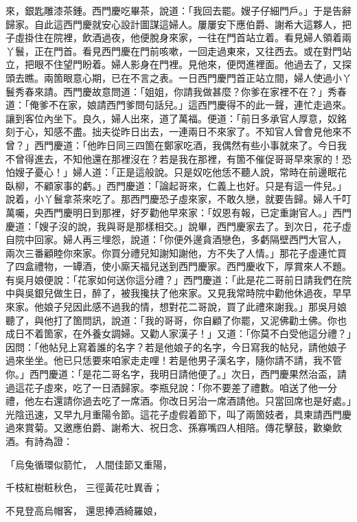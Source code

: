 \begin{showcontents}{}
來，銀匙雕漆茶鍾。西門慶吃畢茶，說道：「我回去罷。嫂子仔細門戶。」于是告辭歸家。自此這西門慶就安心設計圖謀這婦人。屢屢安下應伯爵、謝希大這夥人，把子虛掛住在院裡，飲酒過夜，他便脫身來家，一往在門首站立着。看見婦人領着兩丫鬟，正在門首。看見西門慶在門前咳嗽，一回走過東來，又往西去。或在對門站立，把眼不住望門盼着。婦人影身在門裡。見他來，便閃進裡面。他過去了，又探頭去瞧。兩箇眼意心期，已在不言之表。一日西門慶門首正站立間，婦人使過小丫鬟秀春來請。西門慶故意問道：「姐姐，你請我做甚麼？你爹在家裡不在？」秀春道：「俺爹不在家，娘請西門爹問句話兒。」這西門慶得不的此一聲，連忙走過來。讓到客位內坐下。良久，婦人出來，道了萬福。便道：「前日多承官人厚意，奴銘刻于心，知感不盡。拙夫從昨日出去，一連兩日不來家了。不知官人曾會見他來不曾？」西門慶道：「他昨日同三四箇在鄭家吃酒，我偶然有些小事就來了。今日我不曾得進去，不知他還在那裡沒在？若是我在那裡，有箇不催促哥哥早來家的！恐怕嫂子憂心！」婦人道：「正是這般說。只是奴吃他恁不聽人說，常時在前邊眠花臥柳，不顧家事的虧。」西門慶道：「論起哥來，仁義上也好。只是有這一件兒。」說着，小丫鬟拿茶來吃了。那西門慶恐子虛來家，不敢久戀，就要告歸。婦人千叮萬囑，央西門慶明日到那裡，好歹勸他早來家：「奴恩有報，已定重謝官人。」西門慶道：「嫂子沒的說，我與哥是那樣相交。」說畢，西門慶家去了。到次日，花子虛自院中回家。婦人再三埋怨，說道：「你便外邊貪酒戀色，多虧隔壁西門大官人，兩次三番顧睦你來家。你買分禮兒知謝知謝他，方不失了人情。」那花子虛連忙買了四盒禮物，一罈酒，使小廝天福兒送到西門慶家。西門慶收下，厚賞來人不題。有吳月娘便說：「花家如何送你這分禮？」西門慶道：「此是花二哥前日請我們在院中與吳銀兒做生日，醉了，被我攙扶了他來家。又見我常時院中勸他休過夜，早早來家。他娘子兒因此感不過我的情，想對花二哥說，買了此禮來謝我。」那吳月娘聽了，與他打了箇問訊，說道：「我的哥哥，你自顧了你罷，又泥佛勸土佛。你也成日不着箇家，在外養女調婦。又勸人家漢子！」又道：「你莫不白受他這分禮？」因問：「他帖兒上寫着誰的名字？若是他娘子的名字，今日寫我的帖兒，請他娘子過來坐坐。他已只恁要來咱家走走哩！若是他男子漢名字，隨你請不請，我不管你。」西門慶道：「是花二哥名字，我明日請他便了。」次日，西門慶果然治盃，請過這花子虛來，吃了一日酒歸家。李瓶兒說：「你不要差了禮數。咱送了他一分禮，他左右還請你過去吃了一席酒。你改日另治一席酒請他。只當回席也是好處。」光陰迅速，又早九月重陽令節。這花子虛假着節下，叫了兩箇妓者，具柬請西門慶過來賞菊。又邀應伯爵、謝希大、祝日念、孫寡嘴四人相陪。傳花擊鼓，歡樂飲酒。有詩為證：

「烏兔循環似箭忙，  人間佳節又重陽，

千枝紅樹粧秋色，  三徑黃花吐異香；

不見登高烏帽客，  還思捧酒綺羅娘，


\end{showcontents}
